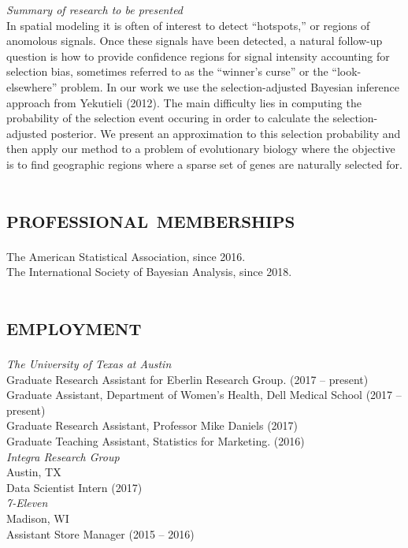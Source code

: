 \documentclass{article}
\begin{document}
\textit{Summary of research to be presented} \\
In spatial modeling it is often of interest to detect ``hotspots,'' or
regions of anomolous signals. Once these signals have been detected, a
natural follow-up question is how to provide confidence regions for
signal intensity accounting for selection bias, sometimes referred to
as the ``winner's curse'' or the ``look-elsewhere'' problem. In our
work we use the selection-adjusted Bayesian inference approach from
Yekutieli (2012). The main difficulty lies in computing the
probability of the selection event occuring in order to calculate the
selection-adjusted posterior. We present an approximation to this
selection probability and then apply our method to a problem of
evolutionary biology where the objective is to find geographic regions
where a sparse set of genes are naturally selected for.



\section{\textbf{\textsc{professional memberships}}}

The American Statistical Association, since 2016.\\
The International Society of Bayesian Analysis, since 2018.

\section{\textbf{\textsc{employment}}}

\textit{The University of Texas at Austin} \\
Graduate Research Assistant for Eberlin Research Group.  (2017 -- present)  \\
Graduate Assistant, Department of Women's Health, Dell Medical School
(2017 -- present) \\
Graduate Research Assistant, Professor Mike Daniels (2017) \\
Graduate Teaching Assistant, Statistics for Marketing. (2016)  \\


\textit{Integra Research Group} \\
Austin, TX \\
Data Scientist Intern (2017) \\

\textit{7-Eleven} \\
Madison, WI \\
Assistant Store Manager (2015 -- 2016)



\end{document}
